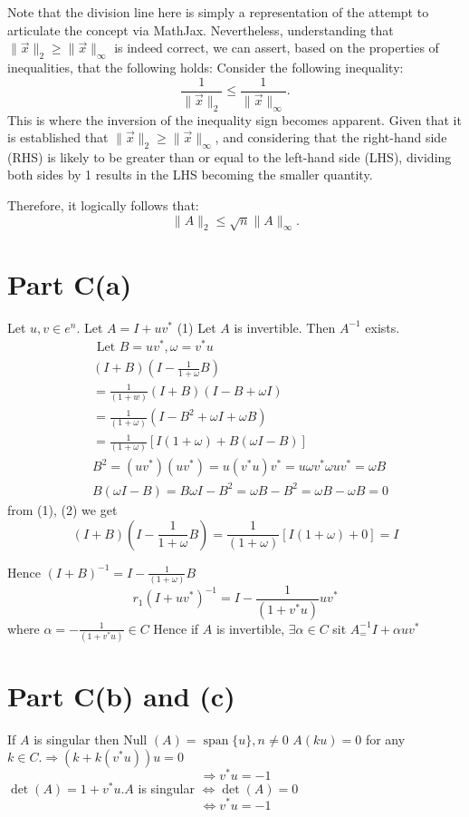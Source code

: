 \documentclass{article}
\begin{document}
Note that the division line here is simply a representation of the attempt to articulate the concept via MathJax. Nevertheless, understanding that \(\|\vec{x}\|_2 \geq \|\vec{x}\|_{\infty}\) is indeed correct, we can assert, based on the properties of inequalities, that the following holds:
Consider the following inequality:
\[
\frac{1}{\|\vec{x}\|_2} \leq \frac{1}{\|\vec{x}\|_{\infty}}.
\]
This is where the inversion of the inequality sign becomes apparent. Given that it is established that \(\|\vec{x}\|_2 \geq \|\vec{x}\|_{\infty}\), and considering that the right-hand side (RHS) is likely to be greater than or equal to the left-hand side (LHS), dividing both sides by 1 results in the LHS becoming the smaller quantity.\par
Therefore, it logically follows that:
\[
\|A\|_2 \leq \sqrt{n}\|A\|_{\infty}.
\]



\section{Part C(a)}
Let $u, v \in e^n$. Let $A=I+u v^*$
(1) Let $A$ is invertible. Then $A^{-1}$ exists.
$$
\begin{aligned}
& \text { Let } B=u v^*, \omega=v^* u \\
& (I+B)\left(I-\frac{1}{1+\omega} B\right) \\
& =\frac{1}{(1+w)}(I+B)(I-B+\omega I) \\
& =\frac{1}{(1+\omega)}\left(I-B^2+\omega I+\omega B\right) \\
& =\frac{1}{(1+\omega)}[I(1+\omega)+B(\omega I-B)] \\
& B^2=\left(u v^*\right)\left(u v^*\right)=u\left(v^* u\right) v^*=u \omega v^* \omega u v^*=\omega B \\
& B(\omega I-B)=B \omega I-B^2=\omega B-B^2=\omega B-\omega B=0
\end{aligned}
$$
from (1), (2) we get
$$
(I+B)\left(I-\frac{1}{1+\omega} B\right)=\frac{1}{(1+\omega)}[I(1+\omega)+0]=I
$$

Hence $(I+B)^{-1}=I-\frac{1}{(1+\omega)} B$
$$
r_1\left(I+u v^*\right)^{-1}=I-\frac{1}{\left(1+v^* u\right)} u v^*
$$
where $\alpha=-\frac{1}{\left(1+v^* u\right)} \in C$
Hence if $A$ is invertible, $\exists \alpha \in C$ sit $A_{=}^{-1} I+\alpha u v^*$
\section{Part C(b) and (c)}
If $A$ is singular then Null $(A)=\operatorname{span}\{u\}, n \neq 0$ $A(k u)=0$ for any $k \in C . \Rightarrow\left(k+k\left(v^* u\right)\right) u=0$
$$
\Rightarrow v^* u=-1
$$
$\operatorname{det}(A)=1+v^* u . A$ is singular $\Leftrightarrow \operatorname{det}(A)=0$
$$
\Leftrightarrow v^* u=-1
$$
\end{document}
